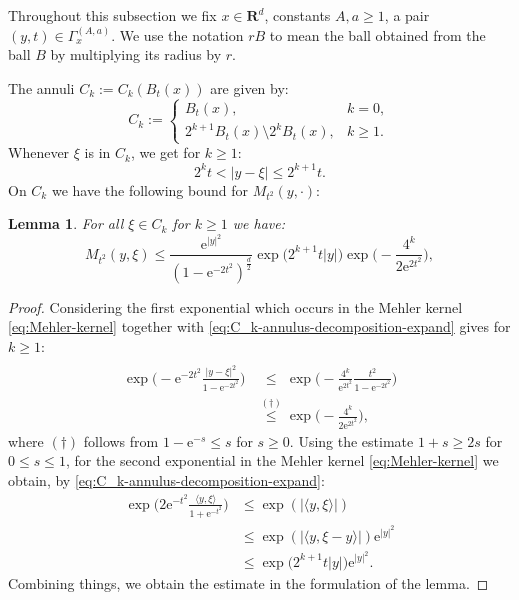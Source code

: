 \documentclass{amsart}
\newtheorem{lemma}{Lemma}
\theoremstyle{remark}
\newcommand{\la}{\langle}
\newcommand{\ra}{\rangle}
\renewcommand{\leq}{\leqslant}
\renewcommand{\geq}{\geqslant}
\newcommand{\R}{\mathbf R}
\newcommand{\e}{\mathrm{e}} %
\begin{document}
Throughout this subsection we fix $x \in \R^d$, constants $A, a \geq 1$, a pair
$(y,t) \in \Gamma_x^{(A, a)}$. We use the notation $rB$ to mean the ball obtained
from the ball $B$ by multiplying its radius by $r$.

The annuli $C_k := C_k(B_t(x))$ are given by:
\begin{equation}
  \label{eq:C_k-annulus-decomposition}
  C_k :=
  \begin{cases}
   B_t(x), &k = 0,\\
   2^{k + 1} B_t(x) \setminus 2^k B_t(x), &k \geq 1.
  \end{cases}
\end{equation}
Whenever $\xi$ is in $C_k$, we get for $k
\geq 1$:
\begin{equation}
  \label{eq:C_k-annulus-decomposition-expand}
  2^k t < |y - \xi| \leq 2^{k + 1} t.
\end{equation}
On $C_k$ we have the following bound for $M_{t^2}(y,\cdot)$:
\begin{lemma}\label{lem:On-diagonal-kernel-estimates-on-Ck}
  For all $\xi \in C_k$ for $k \geq 1$ we have:
  \begin{equation}
    M_{t^2}(y, \xi) \leq \frac{\e^{|y|^2}}{(1 - \e^{-2t^2})^{\frac{d}2}}
    \exp\bigl(2^{k +  1} t |y| \bigr) \exp\Big(-\frac{4^k}{2 \e^{2 t^2}} \Bigr),
  \end{equation}
\end{lemma}
\begin{proof}
  Considering the first exponential which occurs in the Mehler kernel
  \eqref{eq:Mehler-kernel} together with
  \eqref{eq:C_k-annulus-decomposition-expand} gives for $k \geq 1$:
  \begin{align*}
    \exp\biggl(-\e^{-2t^2} \frac{|y - \xi|^2}{1 - \e^{-2t^2}} \biggr)
    &\overset{\phantom{(\dagger)}}{\leq} \exp\biggl(-\frac{4^k}{\e^{2t^2}}
    \frac{t^2}{1 - \e^{-2t^2}} \biggr)\\
    &\overset{(\dagger)}{\leq} \exp\biggl(-\frac{4^k}{2 \e^{2t^2}} \biggr),
  \end{align*}
  where $(\dagger)$ follows from $1 - \e^{-s} \leq s$ for $s \geq 0$. Using the
  estimate $1 + s \geq 2s$ for $0 \leq s \leq 1$, for the second exponential in
  the Mehler kernel \eqref{eq:Mehler-kernel} we obtain, by
  \eqref{eq:C_k-annulus-decomposition-expand}:
  \begin{align*}
    \exp\biggl(2\e^{-t^2} \frac{\la y, \xi \ra}{1 + \e^{- t^2}} \biggr)
    & \leq \exp(|\la y, \xi \ra|)\\
    & \leq \exp(|\langle y, \xi-y\rangle|) \e^{|y|^2}\\
    & \leq \exp\bigl(2^{k + 1} t |y| \bigr) \e^{|y|^2}.
  \end{align*}
  Combining things, we obtain the estimate in the formulation of the lemma.
\end{proof}
\end{document}
